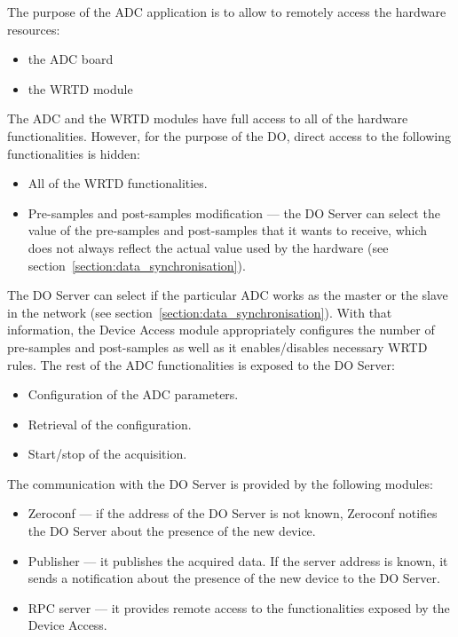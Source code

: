         The purpose of the ADC application is to allow to remotely access the hardware resources:
        \begin{itemize}
            \item the ADC board
            \item the WRTD module
        \end{itemize}
        
        The ADC and the WRTD modules have full access to all of the hardware functionalities. However, for the purpose of the DO, direct access to the following functionalities is hidden:
        \begin{itemize}
            \item All of the WRTD functionalities.
            \item Pre-samples and post-samples modification --- the DO Server can select the value of the pre-samples and post-samples that it wants to receive, which does not always reflect the actual value used by the hardware (see section~\ref{section:data_synchronisation}).
        \end{itemize}
        The DO Server can select if the particular ADC works as the master or the slave in the network (see section~\ref{section:data_synchronisation}). With that information, the Device Access module appropriately configures the number of pre-samples and post-samples as well as it enables/disables necessary WRTD rules. 
        The rest of the ADC functionalities is exposed to the DO Server:
        \begin{itemize}
            \item Configuration of the ADC parameters.
            \item Retrieval of the configuration.
            \item Start/stop of the acquisition.
        \end{itemize}
        The communication with the DO Server is provided by the following modules:
        \begin{itemize}
            \item Zeroconf --- if the address of the DO Server is not known, Zeroconf notifies the DO Server about the presence of the new device.
            \item Publisher --- it publishes the acquired data. If the server address is known, it sends a notification about the presence of the new device to the DO Server.
            \item RPC server --- it provides remote access to the functionalities exposed by the Device Access. 
        \end{itemize}
        

